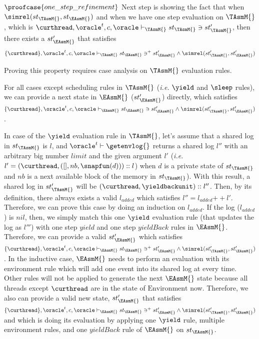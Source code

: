 $\proofcase{one\_step\_refinement}$
Next step is showing the fact that when $\simrel(st_{\TAsmM{}}, st_{\EAsmM{}})$ and 
when we have one step evaluation on $\TAsmM{}$, 
which is $\curthread, \oracle^{t}, c, \oracle \vdash_{\TAsmM{}} st_{\TAsmM{}} \ni st'_{\TAsmM{}} $, 
then there exists a $st'_{\EAsmM{}}$ that satisfies 
$$\{\curthread\}, \oracle^{t}, c, \oracle \vdash_{\TAsmM{}} st_{\EAsmM{}} \ni^{+} st'_{\EAsmM{}} \wedge \simrel(st'_{\TAsmM{}}, st'_{\EAsmM{}})$$

Proving this property requires case analysis on $\TAsmM{}$ evaluation rules.

For all cases except scheduling rules in $\TAsmM{}$ (\textit{i.e.} $\yield$ and $\sleep$ rules), 
we can provide a next state in $\EAsmM{}$ ($st'_{\EAsmM{}}$) directly, which satisfies $\{\curthread\}, \oracle^{t}, c,\oracle \vdash_{\EAsmM{}} st_{\EAsmM{}} \ni st'_{\EAsmM{}} \wedge \simrel(st'_{\TAsmM{}}, st'_{\EAsmM{}})$.

In case of the $\yield$ evaluation rule in $\TAsmM{}$, let's assume that 
a shared log in $st_{\TAsmM{}}$ is $l$, and $\oracle^{t} \vdash \getenvlog{}$ returns a shared log $l''$ with an arbitrary big number $limit$ and the 
given argument $l'$ (\textit{i.e.} $l' = (\curthread , ([], nb, \snapfun(d)))::l$) when $d$ is a 
private state of $st_{\TAsmM{}}$ and $nb$ is a next available block of the memory in $st_{\TAsmM{}}$). 
With this result, a shared log in $st'_{\TAsmM{}}$ will be $(\curthread , \yieldbackunit)::l''$.
Then, by its definition, there always exists a valid $l_{added}$ which satisfies $l'' = l_{added} {+\!\!+} l'$.
Therefore, we can prove this case by doing an induction on $l_{added}$. 
If the log ($l_{added}$) is $nil$, then, we simply match this one $\yield$ evaluation rule 
(that updates the log as $l'''$) with one step $yield$ and one step $yieldBack$ rules in $\EAsmM{}$.
Therefore, we can provide a valid $st'_{\EAsmM{}}$ 
which satisfies $\{\curthread\}, \oracle^{t}, c,\oracle \vdash_{\EAsmM{}} st_{\EAsmM{}} \ni^{+} st'_{\EAsmM{}} \wedge \simrel(st'_{\TAsmM{}}, st'_{\EAsmM{}})$.
In the inductive case, $\EAsmM{}$ needs to perform an evaluation with its environment rule which will add one event 
into its shared log at every time. 
Other rules will not be applied to generate the next $\EAsmM{}$ state because all threads except
$\curthread$ are in the state of $\mathrm{Environment}$ now. 
Therefore, we also can provide a valid new state, $st'_{\EAsmM{}}$ that satisfies 
$\{\curthread\}, \oracle^{t}, c,\oracle \vdash_{\EAsmM{}} st_{\EAsmM{}} \ni^{+} st'_{\EAsmM{}} \wedge \simrel(st'_{\TAsmM{}}, st'_{\EAsmM{}})$ and which is doing its evaluation by applying one $\yield$ rule, multiple environment 
rules, and one $yieldBack$ rule of $\EAsmM{}$ on $st_{\EAsmM{}}$.

